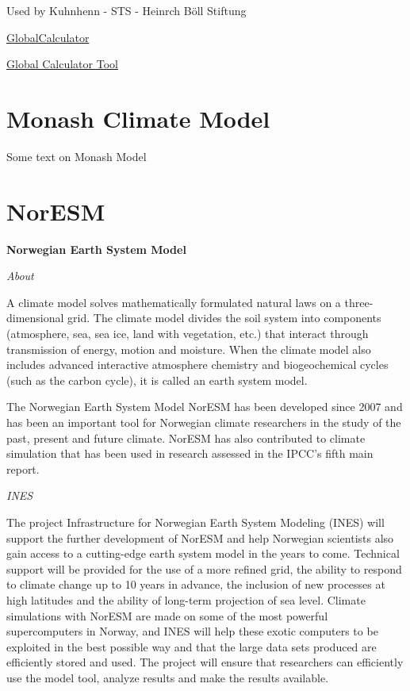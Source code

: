 \documentclass[
]{book}
\begin{document}
Used by Kuhnhenn - STS - Heinrch Böll Stiftung

\href{http://www.globalcalculator.org/}{GlobalCalculator}

\href{http://tool.globalcalculator.org/globcalc.html?levers=22rfoe2e\%2013be1111c2c2c1n31hfjdcef222hp233f211111fn2211111111/dashboard/en}{Global Calculator Tool}

\hypertarget{monash-climate-model}{%
\section{Monash Climate Model}\label{monash-climate-model}}

Some text on Monash Model

\hypertarget{noresm}{%
\section{NorESM}\label{noresm}}

\textbf{Norwegian Earth System Model}

\emph{About}

A climate model solves mathematically formulated natural laws on a three-dimensional grid. The climate model divides the soil system into components (atmosphere, sea, sea ice, land with vegetation, etc.) that interact through transmission of energy, motion and moisture. When the climate model also includes advanced interactive atmosphere chemistry and biogeochemical cycles (such as the carbon cycle), it is called an earth system model.

The Norwegian Earth System Model NorESM has been developed since 2007 and has been an important tool for Norwegian climate researchers in the study of the past, present and future climate. NorESM has also contributed to climate simulation that has been used in research assessed in the IPCC's fifth main report.

\emph{INES}

The project Infrastructure for Norwegian Earth System Modeling (INES) will support the further development of NorESM and help Norwegian scientists also gain access to a cutting-edge earth system model in the years to come. Technical support will be provided for the use of a more refined grid, the ability to respond to climate change up to 10 years in advance, the inclusion of new processes at high latitudes and the ability of long-term projection of sea level.
Climate simulations with NorESM are made on some of the most powerful supercomputers in Norway, and INES will help these exotic computers to be exploited in the best possible way and that the large data sets produced are efficiently stored and used. The project will ensure that researchers can efficiently use the model tool, analyze results and make the results available.
\end{document}
